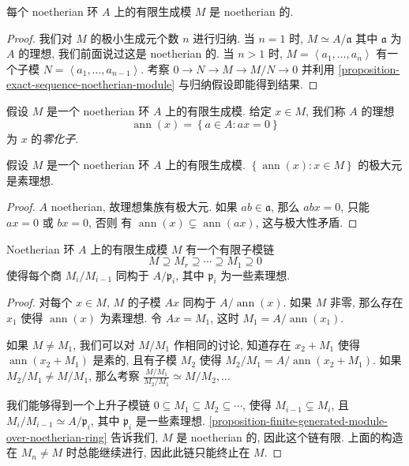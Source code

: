 \begin{proposition}
  \label{proposition-finite-generated-module-over-noetherian-ring}
  每个 noetherian 环 \( A \) 上的有限生成模 \( M \) 是 noetherian 的.
\end{proposition}
\begin{proof}
  我们对 \( M \) 的极小生成元个数 \( n \) 进行归纳. 当 \( n = 1 \) 时, \( M
  \simeq A / \mathfrak{a} \) 其中 \( \mathfrak{a} \) 为 \( A \) 的理想,
  我们前面说过这是 noetherian 的. 当 \( n > 1 \) 时, \( M = \left\langle a_1,
  \ldots, a_n \right\rangle \) 有一个子模 \( N = \left\langle a_1, \ldots, a_{n
  - 1} \right\rangle \). 考察 \( 0 \to N \to M \to M / N \to 0 \) 并利用
  \cref{proposition-exact-sequence-noetherian-module} 与归纳假设即能得到结果.
\end{proof}

假设 \( M \) 是一个 noetherian 环 \( A \) 上的有限生成模. 给定 \( x \in M \),
我们称 \( A \) 的理想
\[
  \operatorname{ann}(x) = \left\lbrace a \in A: ax = 0 \right\rbrace
\]
为 \( x \) 的\emph{零化子}.

\begin{lemma}
  假设 \( M \) 是一个 noetherian 环 \( A \) 上的有限生成模. \( \left\lbrace
  \operatorname{ann}(x) : x \in M \right\rbrace \) 的极大元是素理想.
\end{lemma}
\begin{proof}
  \( A \) noetherian, 故理想集族有极大元. 如果 \( ab \in
  \mathfrak{a} \), 那么 \( abx = 0 \), 只能 \( ax = 0 \) 或 \( bx = 0 \), 否则
  有 \( \operatorname{ann}(x) \subsetneq \operatorname{ann}(ax) \),
  这与极大性矛盾.
\end{proof}

\begin{proposition}
  Noetherian 环 \( A \) 上的有限生成模 \( M \) 有一个有限子模链
  \[
    M \supseteq M_r \supseteq \cdots \supseteq M_1 \supseteq 0
  \]
  使得每个商 \( M_i / M_{i - 1} \) 同构于 \( A / \mathfrak{p}_i \), 其中 \(
  \mathfrak{p}_i \) 为一些素理想.
\end{proposition}
\begin{proof}
  对每个 \( x \in M \), \( M \) 的子模 \( Ax \) 同构于 \( A /
  \operatorname{ann}(x) \). 如果 \( M \) 非零, 那么存在 \( x_1 \) 使得 \(
  \operatorname{ann}(x) \) 为素理想. 令 \( Ax = M_1 \), 这时 \( M_1 = A /
  \operatorname{ann}(x_1) \).

  如果 \( M \neq M_1 \), 我们可以对 \( M / M_1 \) 作相同的讨论, 知道存在 \( x_2
  + M_1 \) 使得 \( \operatorname{ann}(x_2 + M_1) \) 是素的, 且有子模 \( M_2 \)
  使得 \( M_2 / M_1 = A / \operatorname{ann}(x_2 + M_1) \). 如果 \( M_2 / M_1
  \neq M / M_1 \), 那么考察 \( \frac{M / M_1}{M_2 / M_1} \simeq M / M_2, \ldots \)

  我们能够得到一个上升子模链 \( 0 \subseteq M_1 \subseteq M_2 \subseteq \cdots
  \), 使得 \( M_{i -  1} \subsetneq M_{i} \), 且 \( M_{i} / M_{i - 1} \simeq A /
  \mathfrak{p}_{i} \), 其中 \( \mathfrak{p}_i \) 是一些素理想.
  \cref{proposition-finite-generated-module-over-noetherian-ring} 告诉我们, \( M
  \) 是 noetherian 的, 因此这个链有限. 上面的构造在 \( M_n \neq M \)
  时总能继续进行, 因此此链只能终止在 \( M \).
\end{proof}

